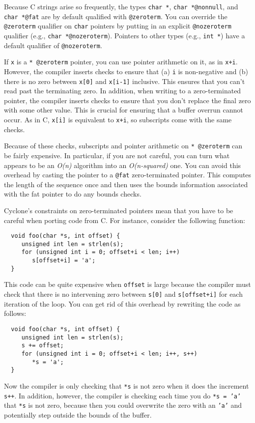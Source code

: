 Because C strings arise so frequently, the types \texttt{char *},
\texttt{char *@nonnull}, and \texttt{char *@fat} are by default
qualified with \texttt{@zeroterm}.  You can override the
\texttt{@zeroterm} qualifier on \texttt{char} pointers by putting in
an explicit \texttt{@nozeroterm} qualifier (e.g., \texttt{char
*@nozeroterm}).  Pointers to other types (e.g., \texttt{int *})
have a default qualifier of \texttt{@nozeroterm}.

If \texttt{x} is a \texttt{* @zeroterm} pointer, you can use pointer
arithmetic on it, as in \texttt{x+i}.  However, the compiler inserts
checks to ensure that (a) \texttt{i} is non-negative and (b) there is
no zero between \texttt{x[0]} and \texttt{x[i-1]} inclusive.  This
ensures that you can't read past the terminating zero.  In addition,
when writing to a zero-terminated pointer, the compiler inserts checks
to ensure that you don't replace the final zero with some other value.
This is crucial for ensuring that a buffer overrun cannot occur.
As in C, \texttt{x[i]} is equivalent to \texttt{x+i}, so subscripts
come with the same checks.

Because of these checks, subscripts and pointer arithmetic on
\texttt{* @zeroterm} can be fairly expensive.  In particular, if you
are not careful, you can turn what appears to be an \emph{O(n)}
algorithm into an \emph{O(n-squared)} one.  You can avoid this
overhead by casting the pointer to a \texttt{@fat} zero-terminated
pointer.  This computes the length of the sequence once and then uses
the bounds information associated with the fat pointer to do any
bounds checks.

Cyclone's constraints on zero-terminated pointers mean that you have
to be careful when porting code from C\@.  For instance, consider the
following function:
\begin{verbatim}
  void foo(char *s, int offset) {
     unsigned int len = strlen(s);
     for (unsigned int i = 0; offset+i < len; i++)
        s[offset+i] = 'a';
  }
\end{verbatim}
This code can be quite expensive when \texttt{offset} is large
because the compiler must check that there is no intervening
zero between \texttt{s[0]} and \texttt{s[offset+i]} for each
iteration of the loop.  You can get rid of this overhead by
rewriting the code as follows:
\begin{verbatim}
  void foo(char *s, int offset) {
     unsigned int len = strlen(s);
     s += offset;
     for (unsigned int i = 0; offset+i < len; i++, s++)
        *s = 'a';
  }
\end{verbatim}
Now the compiler is only checking that \texttt{*s} is not
zero when it does the increment \texttt{s++}.  In addition,
however, the compiler is checking each time you do \texttt{*s = 'a'}
that \texttt{*s} is not zero, because then you could overwrite
the zero with an \texttt{'a'} and potentially step outside
the bounds of the buffer. 

